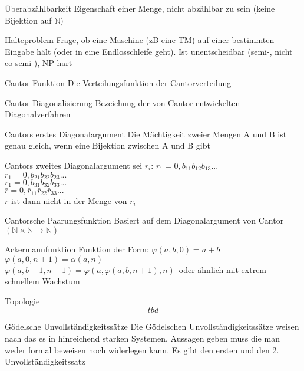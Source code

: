 \documentclass[a7paper,print,grid=both]{kartei}
\begin{document}
\begin{karte}{Überabzählbarkeit}
Eigenschaft einer Menge, nicht abzählbar zu sein (keine Bijektion auf $\mathbb{N}$)
\end{karte}
\begin{karte}{Halteproblem}
Frage, ob eine Maschine (zB eine TM) auf einer bestimmten Eingabe hält (oder in eine Endlosschleife geht). Ist unentscheidbar (semi-, nicht co-semi-), NP-hart
\end{karte}
\begin{karte}{Cantor-Funktion}
Die Verteilungsfunktion der Cantorverteilung
\end{karte}
\begin{karte}{Cantor-Diagonalisierung}
Bezeichung der von Cantor entwickelten Diagonalverfahren
\end{karte}
\begin{karte}{Cantors erstes Diagonalargument}
Die Mächtigkeit zweier Mengen A und B ist genau gleich, wenn  eine Bijektion zwischen A und B gibt
\end{karte}
\begin{karte}{Cantors zweites Diagonalargument}
sei $r_i$: $r_1=0,b_{11}b_{12}b_{13}...$\\$r_1=0,b_{21}b_{22}b_{23}...$\\$r_1=0,b_{31}b_{32}b_{33}...$\\$\bar{r}=0,\bar{r}_{11}\bar{r}_{22}\bar{r}_{33}...$\\$\bar{r}$ ist dann nicht in der Menge von $r_i$
\end{karte}
\begin{karte}{Cantorsche Paarungsfunktion}
Basiert auf dem Diagonalargument von Cantor $(\mathbb{N}\times\mathbb{N}\to\mathbb{N})$
\end{karte}
\begin{karte}{Ackermannfunktion}
Funktion der Form: $\varphi(a, b, 0)=a+b\,$\\$\varphi(a, 0, n+1)=\alpha(a, n)\,$\\$\varphi(a, b+1, n+1)=\varphi(a, \varphi(a, b, n+1), n)\,$ oder ähnlich mit extrem schnellem Wachstum
\end{karte}
\begin{karte}{Topologie}
\[tbd\]
\end{karte}
\begin{karte}{Gödelsche Unvollständigkeitssätze}
Die Gödelschen Unvollständigkeitssätze weisen nach das es in hinreichend starken Systemen, Aussagen geben muss die man weder formal beweisen noch widerlegen kann. Es gibt den ersten und den 2. Unvollständigkeitssatz
\end{karte}
\end{document}
